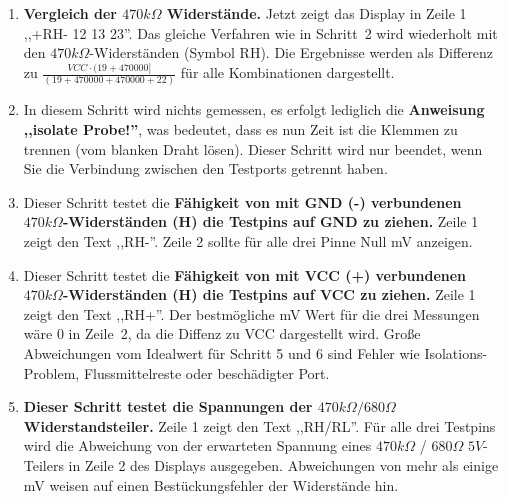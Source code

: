 \begin{enumerate}
\item \textbf {Vergleich der \(470k\Omega\) Widerstände.}
Jetzt zeigt das Display in Zeile 1 ,,+RH- 12 13 23''. Das gleiche Verfahren wie in Schritt~2 wird wiederholt mit den
 \(470k\Omega\)-Widerständen (Symbol RH).
Die Ergebnisse werden als Differenz zu  \(\frac{VCC \cdot (19 + 470000]}{ (19 + 470000 + 470000 + 22)} \) für alle Kombinationen dargestellt.

\item In diesem Schritt wird nichts gemessen, es erfolgt lediglich die \textbf {Anweisung ,,isolate Probe!''},
was bedeutet, dass es nun Zeit ist die Klemmen zu trennen (vom blanken Draht lösen).
Dieser Schritt wird nur beendet, wenn Sie die Verbindung zwischen den Testports getrennt haben.

\item Dieser Schritt testet die \textbf {Fähigkeit von mit GND (-) verbundenen \(470k\Omega\)-Widerständen (H) die Testpins auf GND zu ziehen.}
Zeile 1 zeigt den Text ,,RH-''.
Zeile 2 sollte für alle drei Pinne  Null mV anzeigen.

\item Dieser Schritt testet die \textbf {Fähigkeit von mit VCC (+) verbundenen \(470k\Omega\)-Widerständen (H) die Testpins auf VCC zu ziehen.}
Zeile 1 zeigt den Text ,,RH+''.
Der bestmögliche mV Wert für die drei Messungen wäre 0 in Zeile~2, da die Diffenz zu VCC dargestellt wird.
Große Abweichungen vom Idealwert für Schritt 5 und 6 sind Fehler wie Isolations-Problem, Flussmittelreste oder beschädigter Port.

\item \textbf {Dieser Schritt testet die Spannungen der \(470k\Omega / 680\Omega\)  Widerstandsteiler.}
Zeile 1 zeigt den Text ,,RH/RL''.
Für alle drei Testpins wird die Abweichung von der erwarteten Spannung eines \(470k\Omega\) / \(680\Omega\) \(5V\)-Teilers 
in Zeile 2 des Displays ausgegeben.
Abweichungen von mehr als einige mV weisen auf einen Bestückungsfehler der Widerstände hin.


\end{enumerate}
